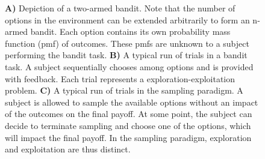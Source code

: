\documentclass[
	12pt,
	oneside,
	bibliography=totocnumbered]{scrartcl}
\newcommand\sideAdj{13}
\begin{document}
\begin{figure}[t]
\begin{center}
{
} %

\captionsetup{width=.9\linewidth, format=plain}
\caption[Experimental Paradigms]{\textbf{A)} Depiction of a two-armed bandit. Note that the number of options in the environment can be extended arbitrarily to form an n-armed bandit. Each option contains its own probability mass function (pmf) of outcomes. These pmfs are unknown to a subject performing the bandit task. \textbf{B)} A typical run of trials in a bandit task. A subject sequentially chooses among options and is provided with feedback. Each trial represents a exploration-exploitation problem.  \textbf{C)} A typical run of trials in the sampling paradigm. A subject is allowed to sample the available options without an impact of the outcomes on the final payoff. At some point, the subject can decide to terminate sampling and choose one of the options, which will impact the final payoff. In the sampling paradigm, exploration and exploitation are thus distinct.}
\label{fig:paradigms}
\end{center}
\end{figure}
\end{document}
